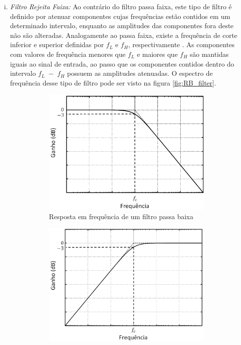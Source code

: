\begin{enumerate}[i),leftmargin=1.75cm,itemindent=0cm]
	\item 
	\textit{Filtro Rejeita Faixa:} Ao contrário do filtro passa faixa, este tipo de filtro é definido por atenuar componentes cujas frequências estão contidos em um determinado intervalo, enquanto as amplitudes das componentes fora deste não são alteradas.  Analogamente ao passa faixa, existe a frequência de corte inferior e superior definidas por $f_L$ e $f_H$, respectivamente \cite{Mussoi2004}. As componentes com valores de frequência menores que $f_L$ e maiores que $f_H$ são mantidas iguais ao sinal de entrada, ao passo que os componentes contidos dentro do intervalo $f_L\;-\;f_H$ possuem as amplitudes atenuadas. O espectro de frequência desse tipo de filtro pode ser visto na figura \ref{fig:RB_filter}.
		
	\begin{figure}[!htbp] %
		\centering
		\begin{subfigure}[b]{0.48\textwidth}
			\centering
			\includegraphics[width=\textwidth]{Cap2/Figuras/LP_filter_BW.png}
			\caption{\centering Resposta em frequência de um filtro passa baixa} 
			\label{fig:LP_filter}
		\end{subfigure}%
		\hfill
		\begin{subfigure}[b]{0.48\textwidth}  
			\centering 
			\includegraphics[width=\textwidth]{Cap2/Figuras/HP_filter_BW.png}

\end{subfigure}
\end{figure}
\end{enumerate}
